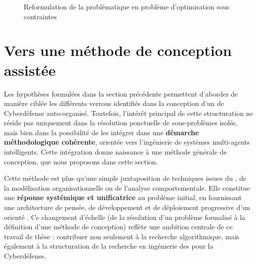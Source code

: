 \begin{figure}[H]
    \centering
    \resizebox{\textwidth}{!}{%
        
    }
    \caption{Reformulation de la problématique en problème d'optimisation sous contraintes}
    \label{fig:constrained_optimization_overview}
\end{figure}

\section{Vers une méthode de conception assistée}\label{sec:method-response}


Les hypothèses formulées dans la section précédente permettent d'aborder de manière ciblée les différents verrous identifiés dans la conception d'un  de Cyberdéfense auto-organisé. Toutefois, l'intérêt principal de cette structuration ne réside pas uniquement dans la résolution ponctuelle de sous-problèmes isolés, mais bien dans la possibilité de les intégrer dans une \textbf{démarche méthodologique cohérente}, orientée vers l'ingénierie de systèmes multi-agents intelligents. Cette intégration donne naissance à une méthode générale de conception, que nous proposons dans cette section.

Cette méthode est plus qu'une simple juxtaposition de techniques issues du , de la modélisation organisationnelle ou de l'analyse comportementale. Elle constitue une \textbf{réponse systémique et unificatrice} au problème initial, en fournissant une architecture de pensée, de développement et de déploiement progressive d'un  orienté . Ce changement d'échelle (de la résolution d'un problème formalisé à la définition d'une méthode de conception) reflète une ambition centrale de ce travail de thèse : contribuer non seulement à la recherche algorithmique, mais également à la structuration de la recherche en ingénierie des  pour la Cyberdéfense.

